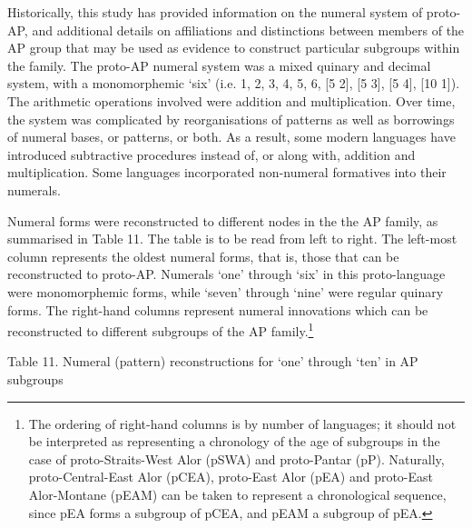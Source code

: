 Historically, this study has provided information on the numeral system of proto-AP, and additional details on affiliations and distinctions between members of the AP group that may be used as evidence to construct particular subgroups within the family. The proto-AP numeral system was a mixed quinary and decimal system, with a monomorphemic {\textquoteleft}six{\textquoteright} (i.e. 1, 2, 3, 4, 5, 6, [5 2], [5 3], [5 4], [10 1]). The arithmetic operations involved were addition and multiplication. Over time, the system was complicated by reorganisations of patterns as well as borrowings of numeral bases, or patterns, or both. As a result, some modern languages have introduced subtractive procedures instead of, or along with, addition and multiplication. Some languages incorporated non-numeral formatives into their numerals. 

Numeral forms were reconstructed to different nodes in the the AP family, as summarised in Table 11. The table is to be read from left to right. The left-most column represents the oldest numeral forms, that is, those that can be reconstructed to proto-AP. Numerals {\textquoteleft}one{\textquoteright} through {\textquoteleft}six{\textquoteright} in this proto-language were monomorphemic forms, while {\textquoteleft}seven{\textquoteright} through {\textquoteleft}nine{\textquoteright} were regular quinary forms. The right-hand columns represent numeral innovations which can be reconstructed to different subgroups of the AP family.\footnote{The ordering of right-hand columns is by number of languages; it should not be interpreted as representing a chronology of the age of subgroups in the case of proto-Straits-West Alor (pSWA) and proto-Pantar (pP). Naturally, proto-Central-East Alor (pCEA), proto-East Alor (pEA) and proto-East Alor-Montane (pEAM) can be taken to represent a chronological sequence, since pEA 
forms a subgroup of pCEA, and pEAM a subgroup of pEA.} 

Table 11. Numeral (pattern) reconstructions for {\textquoteleft}one{\textquoteright} through {\textquoteleft}ten{\textquoteright} in AP subgroups 

